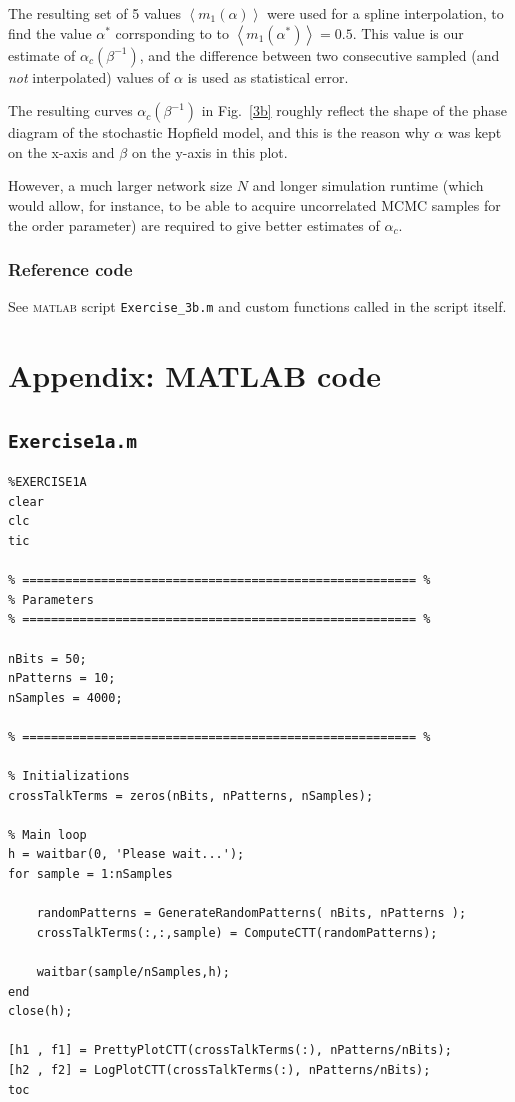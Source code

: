 \documentclass[12pt,A4,titlepage]{article}
\begin{document}
The resulting set of 5 values $\left<m_1(\alpha)\right>$ were used for a spline interpolation, to find the value $\alpha^*$ corrsponding to to $\left<m_1(\alpha^*)\right> = 0.5$. This value is our estimate of $\alpha_c(\beta^{-1})$, and the difference between two consecutive sampled (and \emph{not} interpolated) values of $\alpha$ is used as statistical error.

The resulting curves $\alpha_c(\beta^{-1})$ in Fig.~\ref{3b} roughly reflect the shape of the phase diagram of the stochastic Hopfield model, and this is the reason why $\alpha$ was kept on the x-axis and $\beta$ on the y-axis in this plot. 

However, a much larger network size $N$ and longer simulation runtime (which would allow, for instance, to be able to acquire uncorrelated MCMC samples for the order parameter) are required to give better estimates of $\alpha_c$.

\subsubsection*{Reference code}
See \textsc{matlab} script \verb!Exercise_3b.m! and custom functions called in the script itself.
\clearpage

\appendix
\section*{Appendix: MATLAB code}

\subsection*{\texttt{Exercise1a.m}}
\begin{lstlisting}
%EXERCISE1A
clear
clc
tic

% ======================================================= %
% Parameters
% ======================================================= %

nBits = 50;
nPatterns = 10;
nSamples = 4000;

% ======================================================= %

% Initializations
crossTalkTerms = zeros(nBits, nPatterns, nSamples);

% Main loop
h = waitbar(0, 'Please wait...');
for sample = 1:nSamples
    
    randomPatterns = GenerateRandomPatterns( nBits, nPatterns );
    crossTalkTerms(:,:,sample) = ComputeCTT(randomPatterns);
    
    waitbar(sample/nSamples,h);
end
close(h);

[h1 , f1] = PrettyPlotCTT(crossTalkTerms(:), nPatterns/nBits);
[h2 , f2] = LogPlotCTT(crossTalkTerms(:), nPatterns/nBits);
toc
\end{lstlisting}
\end{document}
